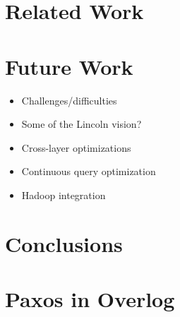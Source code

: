 \documentclass{article}
\begin{document}
\section{Related Work}

\section{Future Work}
\begin{itemize}
\item
  Challenges/difficulties

\item
  Some of the Lincoln vision?

\item
  Cross-layer optimizations

\item
  Continuous query optimization

\item
  Hadoop integration
\end{itemize}

\section{Conclusions}


\appendix
\section{Paxos in Overlog}
\end{document}
